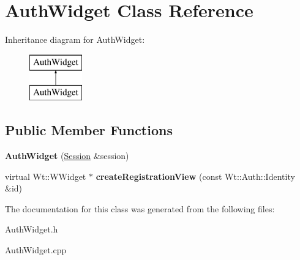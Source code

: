 \hypertarget{class_auth_widget}{}\section{Auth\+Widget Class Reference}
\label{class_auth_widget}
Inheritance diagram for Auth\+Widget\+:\begin{figure}[H]
\begin{center}
\leavevmode
\includegraphics[height=2.000000cm]{class_auth_widget}
\end{center}
\end{figure}
\subsection*{Public Member Functions}
\begin{DoxyCompactItemize}
\item 
\mbox{\label{class_auth_widget_a16b0f0ad98e79aa40992cfaa9a00cfde}} 
{\bfseries Auth\+Widget} (\hyperlink{class_session}{Session} \&session)
\item 
\mbox{\label{class_auth_widget_abfa295703272e72a5d57dd736cc9f329}} 
virtual Wt\+::\+W\+Widget $\ast$ {\bfseries create\+Registration\+View} (const Wt\+::\+Auth\+::\+Identity \&id)
\end{DoxyCompactItemize}


The documentation for this class was generated from the following files\+:\begin{DoxyCompactItemize}
\item 
Auth\+Widget.\+h\item 
Auth\+Widget.\+cpp\end{DoxyCompactItemize}
